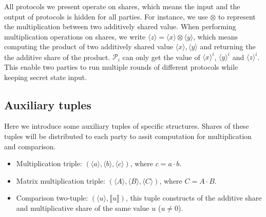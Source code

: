 \documentclass[letterpaper]{article} %
\begin{document}
    All protocols we present operate on shares, which means
    the input and the output of protocols is hidden for all parties.
    For instance, we use $\otimes$ to represent the multiplication between two additively shared value.
    When performing multiplication operations on shares,
    we write $\langle z\rangle=\langle x\rangle\otimes  \langle y\rangle $,
    which means computing the product of two additively shared value $\langle x\rangle, \langle y\rangle$ and returning the
    the additive share of the product.
    $\mathcal{P}_{i}$ can only get the value of $\langle x\rangle ^{i}$, $\langle y\rangle ^{i}$ and $\langle z\rangle ^{i}$.
    This enable two parties to run multiple rounds of different protocols
    while keeping secret state input.

    \subsection{Auxiliary tuples}
    Here we introduce some auxiliary tuples of specific structures.
    Shares of these tuples will be distributed to each party to
    assit computation for multiplication and comparison.
    \begin{itemize}
        \item Multiplication triple: $(\langle a\rangle,\langle b\rangle,\langle c\rangle)$, where $c=a\cdot b$.
        \item Matrix multiplication triple: $(\langle A\rangle,\langle B\rangle,\langle C\rangle)$, where $C=A\cdot B$.
        \item Comparison two-tuple: $(\langle u\rangle,\llbracket u \rrbracket)$,
        this tuple constructs of the additive share and multiplicative share of the same value $u$ ($u\neq 0 $).
    \end{itemize}
\end{document}
